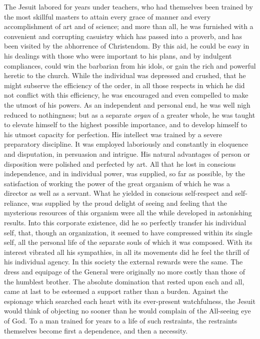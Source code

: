 \documentclass[]{book}
\begin{document}
The Jesuit labored for years under teachers, who had themselves been trained by the most skillful masters to attain every grace of manner and every accomplishment of art and of science; and more than all, he was furnished with a convenient and corrupting casuistry which has passed into a proverb, and has been visited by the abhorrence of Christendom. By this aid, he could be easy in his dealings with those who were important to his plans, and by indulgent compliances, could win the barbarian from his idols, or gain the rich and powerful heretic to the church. While the individual was depressed and crushed, that he might subserve the efficiency of the order, in all those respects in which he did not conflict with this efficiency, he was encouraged and even compelled to make the utmost of his powers. As an independent and personal end, he was well nigh reduced to nothingness; but as a separate \emph{organ} of a greater whole, he was taught to elevate himself to the highest possible importance, and to develop himself to his utmost capacity for perfection. His intellect was trained by a severe preparatory discipline. It was employed laboriously and constantly in eloquence and disputation, in persuasion and intrigue. His natural advantages of person or disposition were polished and perfected by art. All that he lost in conscious independence, and in individual power, was supplied, so far as possible, by the satisfaction of working the power of the great organism of which he was a director as well as a servant. What he yielded in conscious self-respect and self-reliance, was supplied by the proud delight of seeing and feeling that the mysterious resources of this organism were all the while developed in astonishing results. Into this corporate existence, did he so perfectly transfer his individual self, that, though an organization, it seemed to have compressed within its single self, all the personal life of the separate souls of which it was composed. With its interest vibrated all his sympathies, in all its movements did he feel the thrill of his individual agency. In this society the external rewards were the same. The dress and equipage of the General were originally no more costly than those of the humblest brother. The absolute domination that rested upon each and all, came at last to be esteemed a support rather than a burden. Against the espionage which searched each heart with its ever-present watchfulness, the Jesuit would think of objecting no sooner than he would complain of the All-seeing eye of God. To a man trained for years to a life of such restraints, the restraints themselves become first a dependence, and then a necessity.
\end{document}
